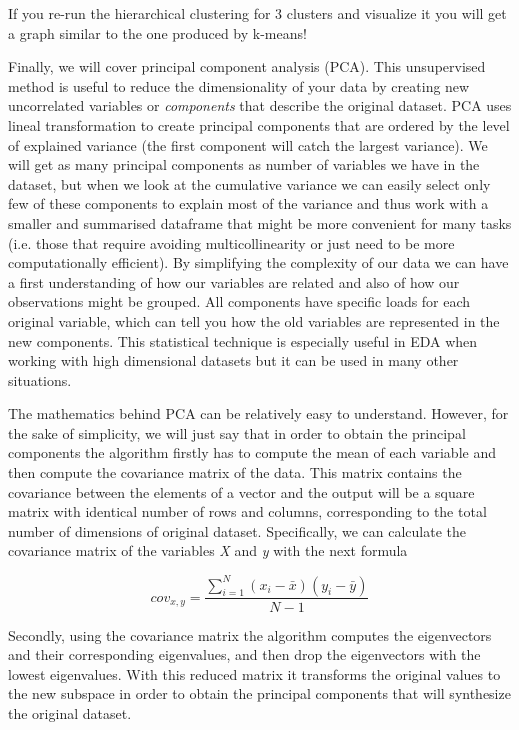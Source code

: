 
If you re-run the hierarchical clustering for 3 clusters and visualize it you will get a graph similar to the one produced by k-means!


Finally, we will cover principal component analysis (PCA). This unsupervised method is useful to reduce the dimensionality of your data by creating new uncorrelated variables or \textit{components} that describe the original dataset. PCA uses lineal transformation to create principal components that are ordered by the level of explained variance (the first component will catch the largest variance). We will get as many principal components as number of variables we have in the dataset, but when we look at the cumulative variance we can easily select only few of these components to explain most of the variance and thus work with a smaller and summarised dataframe that might be more convenient for many tasks (i.e. those that require avoiding multicollinearity or just need to be more computationally efficient). By simplifying the complexity of our data we can have a first understanding of how our variables are related and also of how our observations might be grouped. All components have specific loads for each original variable, which can tell you how the old variables are represented in the new components. This statistical technique is especially useful in EDA when working with high dimensional datasets but it can be used in many other situations.  

The mathematics behind PCA can be  relatively easy to understand. However, for the sake of simplicity, we will just say that in order to obtain the principal components the algorithm firstly has to compute the mean of each variable and then compute the covariance matrix of the data. This matrix contains the covariance between the elements of a vector and the output will be a square matrix with identical number of rows and columns, corresponding to the total number of dimensions of original dataset. Specifically, we can calculate the covariance matrix of the variables \emph{X} and \emph{y} with the next formula

$$cov_{x,y}=\frac{\sum_{i=1}^{N}(x_{i}-\bar{x})(y_{i}-\bar{y})}{N-1}$$

Secondly, using the covariance matrix the algorithm computes the eigenvectors and their corresponding eigenvalues, and then drop the eigenvectors with the lowest eigenvalues. With this reduced matrix it transforms the original values to the new subspace in order to obtain the principal components that will synthesize the original dataset.

